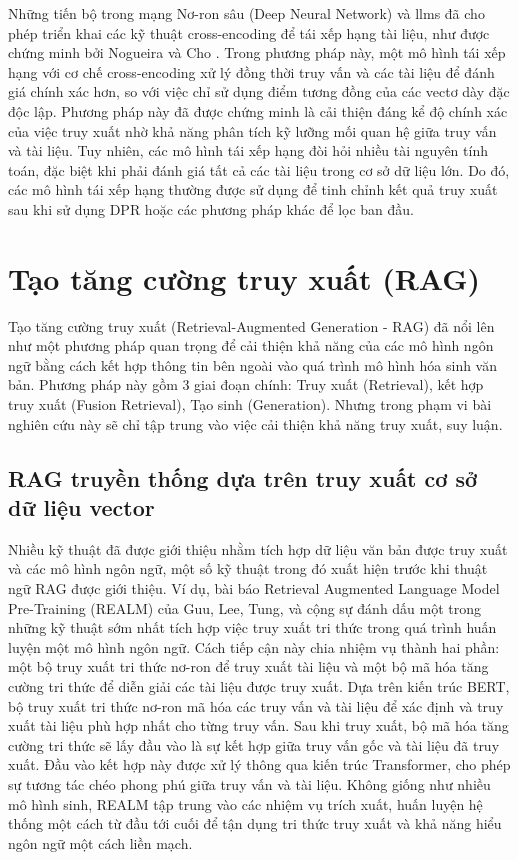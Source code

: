 Những tiến bộ trong mạng Nơ-ron sâu (Deep Neural Network) và \gls{llm}s đã cho phép triển khai các kỹ thuật cross-encoding để tái xếp hạng tài liệu, như được chứng minh bởi Nogueira và Cho \cite{nogueira2019passage}. Trong phương pháp này, một mô hình tái xếp hạng với cơ chế cross-encoding xử lý đồng thời truy vấn và các tài liệu để đánh giá chính xác hơn, so với việc chỉ sử dụng điểm tương đồng của các vectơ dày đặc độc lập. Phương pháp này đã được chứng minh là cải thiện đáng kể độ chính xác của việc truy xuất nhờ khả năng phân tích kỹ lưỡng mối quan hệ giữa truy vấn và tài liệu. Tuy nhiên, các mô hình tái xếp hạng đòi hỏi nhiều tài nguyên tính toán, đặc biệt khi phải đánh giá tất cả các tài liệu trong cơ sở dữ liệu lớn. Do đó, các mô hình tái xếp hạng thường được sử dụng để tinh chỉnh kết quả truy xuất sau khi sử dụng DPR hoặc các phương pháp khác để lọc ban đầu.


\section{Tạo tăng cường truy xuất (RAG)}
\label{section:retrieval_augmented_generation}
Tạo tăng cường truy xuất (Retrieval-Augmented Generation - RAG) đã nổi lên như một phương pháp quan trọng để cải thiện khả năng của các mô hình ngôn ngữ bằng cách kết hợp thông tin bên ngoài vào quá trình mô hình hóa sinh văn bản. Phương pháp này gồm 3 giai đoạn chính: Truy xuất (Retrieval), kết hợp truy xuất (Fusion Retrieval), Tạo sinh (Generation). Nhưng trong phạm vi bài nghiên cứu này sẽ chỉ tập trung vào việc cải thiện khả năng truy xuất, suy luận.


\subsection{RAG truyền thống dựa trên truy xuất cơ sở dữ liệu vector}
\label{subsection:traditional_rag}


Nhiều kỹ thuật đã được giới thiệu nhằm tích hợp dữ liệu văn bản được truy xuất và các mô hình ngôn ngữ, một số kỹ thuật trong đó xuất hiện trước khi thuật ngữ RAG được giới thiệu. Ví dụ, bài báo Retrieval Augmented Language Model Pre-Training (REALM) của Guu, Lee, Tung, và cộng sự \cite{guu2020realm} đánh dấu một trong những kỹ thuật sớm nhất tích hợp việc truy xuất tri thức trong quá trình huấn luyện một mô hình ngôn ngữ. Cách tiếp cận này chia nhiệm vụ thành hai phần: một bộ truy xuất tri thức nơ-ron để truy xuất tài liệu và một bộ mã hóa tăng cường tri thức để diễn giải các tài liệu được truy xuất. Dựa trên kiến trúc BERT, bộ truy xuất tri thức nơ-ron mã hóa các truy vấn và tài liệu để xác định và truy xuất tài liệu phù hợp nhất cho từng truy vấn. Sau khi truy xuất, bộ mã hóa tăng cường tri thức sẽ lấy đầu vào là sự kết hợp giữa truy vấn gốc và tài liệu đã truy xuất. Đầu vào kết hợp này được xử lý thông qua kiến trúc Transformer, cho phép sự tương tác chéo phong phú giữa truy vấn và tài liệu. Không giống như nhiều mô hình sinh, REALM tập trung vào các nhiệm vụ trích xuất, huấn luyện hệ thống một cách từ đầu tới cuối để tận dụng tri thức truy xuất và khả năng hiểu ngôn ngữ một cách liền mạch.


